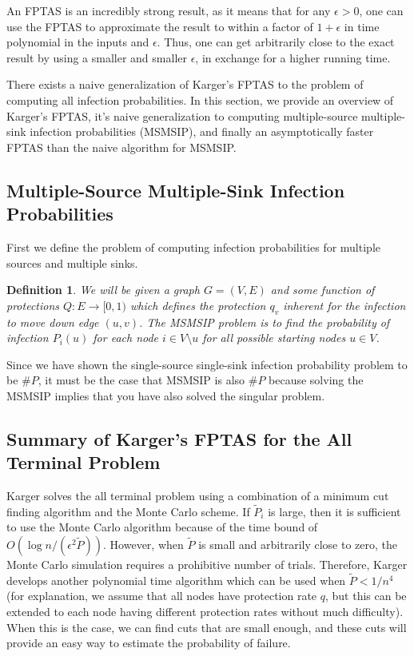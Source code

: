 \documentclass{article}
\theoremstyle{plain}
\newtheorem{definition}{Definition}
\begin{document}
An FPTAS is an incredibly strong result, as it means that for any $\epsilon > 0$, one can use the FPTAS to approximate the result to within a factor of $1 + \epsilon$ in time polynomial in the inputs and $\epsilon$. Thus, one can get arbitrarily close to the exact result by using a smaller and smaller $\epsilon$, in exchange for a higher running time.

There exists a naive generalization of Karger's FPTAS to the problem of computing all infection probabilities. In this section, we provide an overview of Karger's FPTAS, it's naive generalization to computing multiple-source multiple-sink infection probabilities (MSMSIP), and finally an asymptotically faster FPTAS than the naive algorithm for MSMSIP.

\subsection{Multiple-Source Multiple-Sink Infection Probabilities}

First we define the problem of computing infection probabilities for multiple sources and multiple sinks.

\begin{definition}
    We will be given a graph $G = (V,E)$ and some function of protections $Q: E \to [0,1)$ which defines the protection $q_v$ inherent for the infection to move down edge $(u,v)$. The \emph{MSMSIP problem} is to find the probability of infection $P_i(u)$ for each node $i \in V \setminus u$ for all possible starting nodes $u \in V$.
  \end{definition}

  Since we have shown the single-source single-sink infection probability problem to be $\# P$, it must be the case that MSMSIP is also $\# P$ because solving the MSMSIP implies that you have also solved the singular problem.

\subsection{Summary of Karger's FPTAS for the All Terminal Problem}

Karger solves the all terminal problem using a combination of a minimum cut finding algorithm and the Monte Carlo scheme. If $\tilde{P}_i$ is large, then it is sufficient to use the Monte Carlo algorithm because of the time bound of $O(\log n / (\epsilon^2 \tilde{P}))$. However, when $\tilde{P}$ is small and arbitrarily close to zero, the Monte Carlo simulation requires a prohibitive number of trials. Therefore, Karger develops another polynomial time algorithm which can be used when $\tilde{P} < 1/n^4$ (for explanation, we assume that all nodes have protection rate $q$, but this can be extended to each node having different protection rates without much difficulty). When this is the case, we can find cuts that are small enough, and these cuts will provide an easy way to estimate the probability of failure.
\end{document}
